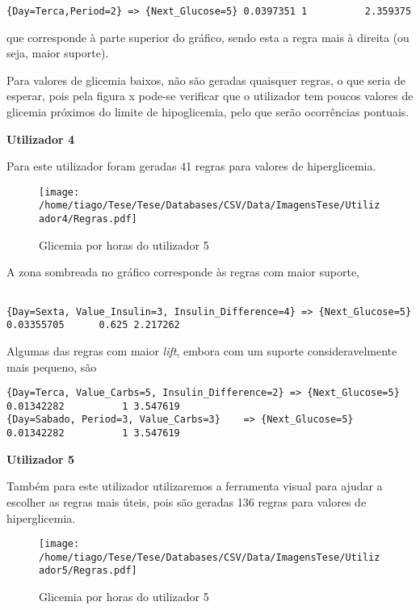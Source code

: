 \begin{lstlisting}
{Day=Terca,Period=2} => {Next_Glucose=5} 0.0397351 1          2.359375
\end{lstlisting}

que corresponde à parte superior do gráfico, sendo esta a regra mais à direita (ou seja, maior suporte). 

Para valores de glicemia baixos, não são geradas quaisquer regras, o que seria de esperar, pois pela figura x pode-se verificar que o utilizador tem poucos valores de glicemia próximos do limite de hipoglicemia, pelo que serão ocorrências pontuais. 


\textbf{Utilizador 4}

Para este utilizador foram geradas 41 regras para valores de hiperglicemia.



\begin{figure}[H]
\centering
\texttt{[image: /home/tiago/Tese/Tese/Databases/CSV/Data/ImagensTese/Utilizador4/Regras.pdf]}
\caption{Glicemia por horas do utilizador 5}
\end{figure}
 A zona sombreada no gráfico corresponde às regras com maior suporte,
 

\begin{lstlisting}

{Day=Sexta, Value_Insulin=3, Insulin_Difference=4} => {Next_Glucose=5} 0.03355705      0.625 2.217262

\end{lstlisting}

Algumas das regras com maior \textit{lift}, embora com um suporte consideravelmente mais pequeno, são

\begin{lstlisting}
{Day=Terca, Value_Carbs=5, Insulin_Difference=2} => {Next_Glucose=5} 0.01342282          1 3.547619
{Day=Sabado, Period=3, Value_Carbs=3}    => {Next_Glucose=5} 0.01342282          1 3.547619
\end{lstlisting}



\textbf{Utilizador 5}

Também para este utilizador utilizaremos a ferramenta visual para ajudar a escolher as regras mais úteis, pois são geradas 136 regras para valores de hiperglicemia. 

\begin{figure}[H]
\centering
\texttt{[image: /home/tiago/Tese/Tese/Databases/CSV/Data/ImagensTese/Utilizador5/Regras.pdf]}
\caption{Glicemia por horas do utilizador 5}
\end{figure}


